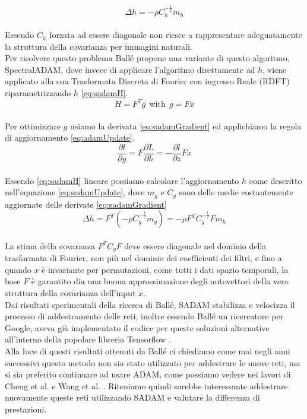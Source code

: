 \begin{equation}\label{eq:adamUpdate}
\Delta h = - \rho C_{h}^{-\tfrac{1}{2}} m_{h}
\end{equation}\\
Essendo $C_{h}$ forzata ad essere diagonale non riesce a rappresentare adeguatamente la struttura della covarianza per immagini naturali.\\
Per risolvere questo problema Ballé propone una variante di questo algoritmo, SpectralADAM, dove invece di applicare l’algoritmo direttamente ad $h$, viene applicato alla sua Trasformata Discreta di Fourier con ingresso Reale (RDFT) riparametrizzando $h$ \ref{eq:sadamH}.\\
\begin{equation}\label{eq:sadamH}
H = F^{T} g \:\: \textrm{with} \:\: g = Fx
\end{equation}\\
Per ottimizzare $g$ usiamo la derivata \ref{eq:sadamGradient} ed applichiamo la regola di aggiornamento \ref{eq:adamUpdate}.\\
\begin{equation}\label{eq:sadamGradient}
\dfrac{\partial l}{\partial g} = F \dfrac{\partial L}{\partial h} = - \dfrac{\partial l}{\partial z} Fx
\end{equation}\\
Essendo \ref{eq:sadamH} lineare possiamo calcolare l’aggiornamento $h$ come descritto nell’equazione \ref{eq:sadamUpdate}, dove $m_{g}$ e $C_{g}$ sono delle medie costantemente aggiornate delle derivate \ref{eq:sadamGradient} \\
\begin{equation}\label{eq:sadamUpdate}
\Delta h = F^{T} (-\rho C_{g}^{-\tfrac{1}{2}} m_{g}) = - \rho F^{T} C_{g}^{-\tfrac{1}{2}} Fm_{h}
\end{equation}\\
La stima della covaranza $ F^{T} C_{g} F$ deve essere diagonale nel dominio della trasformata di Fourier, non più nel dominio dei coefficienti dei filtri, e fino a quando $x$ è invariante per permutazioni, come tutti i dati spazio temporali, la base $F$ è garantito dia una buona approssimazione degli autovettori della vera struttura della covarianza dell’input $x$.\\
Dai risultati sperimentali della ricerca di Ballé, SADAM stabilizza e velocizza il processo di addestramento delle reti, inoltre essendo Ballé un ricercatore per Google, aveva già implementato il codice per queste soluzioni alternative all’interno della popolare libreria Tensorflow \cite{tensorflow2015-whitepaper}.\\
Alla luce di questi risultati ottenuti da Ballé ci chiediamo come mai negli anni successivi questo metodo non sia stato utilizzato per addestrare le nuove reti, ma si sia preferito continuare ad usare ADAM, come possiamo vedere nei lavori di Cheng et al. \cite{cheng2020learned} e Wang et al. \cite{wang2022neural}. Riteniamo quindi sarebbe interessante addestrare nuovamente queste reti utilizzando SADAM e valutare la differenza di prestazioni.


